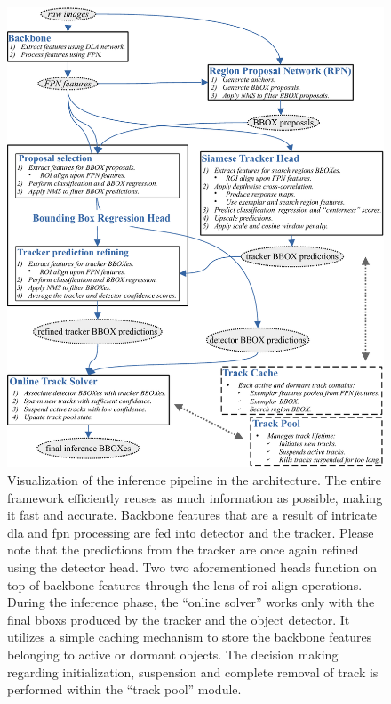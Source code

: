 \begin{figure}[!t]
    \centering
    \includegraphics[width=\linewidth]{figures/siamese_tracking/siammot_inference_diagram.pdf}
    \caption[\siammot{} inference diagram]{Visualization of the inference pipeline in the \siammot{} architecture. The entire framework efficiently reuses as much information as possible, making it fast and accurate. Backbone features that are a result of intricate \gls{dla} and \gls{fpn} processing are fed into detector and the tracker. Please note that the predictions from the tracker are once again refined using the detector head. Two two aforementioned heads function on top of backbone features through the lens of \gls{roi} align operations. During the inference phase, the ``online solver'' works only with the final \glspl{bbox} produced by the tracker and the object detector. It utilizes a simple caching mechanism to store the backbone features belonging to active or dormant objects. The decision making regarding initialization, suspension and complete removal of track is performed within the ``track pool'' module.}
    \label{fig:SiamMOTInference}
\end{figure}

